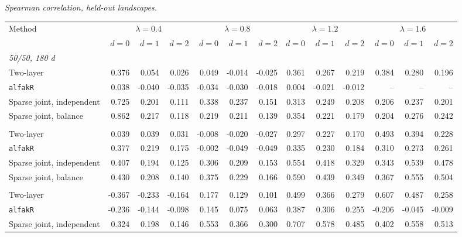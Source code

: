 \noindent\textit{Spearman correlation, held-out landscapes.}
\begin{center}
\scriptsize
\setlength{\tabcolsep}{2.5pt}
\begin{tabular}{l*{12}{r}}
\toprule
Method & \multicolumn{3}{c}{$\lambda=0.4$} & \multicolumn{3}{c}{$\lambda=0.8$} & \multicolumn{3}{c}{$\lambda=1.2$} & \multicolumn{3}{c}{$\lambda=1.6$} \\
\cmidrule(lr){2-4}\cmidrule(lr){5-7}\cmidrule(lr){8-10}\cmidrule(lr){11-13}
 & $d=0$ & $d=1$ & $d=2$ & $d=0$ & $d=1$ & $d=2$ & $d=0$ & $d=1$ & $d=2$ & $d=0$ & $d=1$ & $d=2$ \\
\midrule
\multicolumn{13}{l}{\textit{50/50, 180 d}} \\
\quad Two-layer & 0.376 & 0.054 & 0.026 & 0.049 & -0.014 & -0.025 & 0.361 & 0.267 & 0.219 & 0.384 & 0.280 & 0.196 \\
\quad \texttt{alfakR} & 0.038 & -0.040 & -0.035 & -0.034 & -0.030 & -0.018 & 0.004 & -0.021 & -0.012 & -- & -- & -- \\
\quad Sparse joint, independent & 0.725 & 0.201 & 0.111 & 0.338 & 0.237 & 0.151 & 0.313 & 0.249 & 0.208 & 0.206 & 0.237 & 0.201 \\
\quad Sparse joint, balance & 0.862 & 0.217 & 0.118 & 0.219 & 0.211 & 0.139 & 0.354 & 0.221 & 0.179 & 0.204 & 0.276 & 0.242 \\
\addlinespace[2pt]
\multicolumn{13}{l}{\textit{200/200, 180 d}} \\
\quad Two-layer & 0.039 & 0.039 & 0.031 & -0.008 & -0.020 & -0.027 & 0.297 & 0.227 & 0.170 & 0.493 & 0.394 & 0.228 \\
\quad \texttt{alfakR} & 0.377 & 0.219 & 0.175 & -0.002 & -0.049 & -0.049 & 0.335 & 0.230 & 0.184 & 0.310 & 0.273 & 0.261 \\
\quad Sparse joint, independent & 0.407 & 0.194 & 0.125 & 0.306 & 0.209 & 0.153 & 0.554 & 0.418 & 0.329 & 0.343 & 0.539 & 0.478 \\
\quad Sparse joint, balance & 0.430 & 0.208 & 0.140 & 0.375 & 0.229 & 0.166 & 0.590 & 0.439 & 0.349 & 0.367 & 0.555 & 0.504 \\
\addlinespace[2pt]
\multicolumn{13}{l}{\textit{200/200, 360 d}} \\
\quad Two-layer & -0.367 & -0.233 & -0.164 & 0.177 & 0.129 & 0.101 & 0.499 & 0.366 & 0.279 & 0.607 & 0.487 & 0.258 \\
\quad \texttt{alfakR} & -0.236 & -0.144 & -0.098 & 0.145 & 0.075 & 0.063 & 0.387 & 0.306 & 0.255 & -0.206 & -0.045 & -0.009 \\
\quad Sparse joint, independent & 0.324 & 0.198 & 0.146 & 0.553 & 0.366 & 0.300 & 0.707 & 0.578 & 0.485 & 0.402 & 0.558 & 0.513 \\

\end{tabular}
\end{center}
